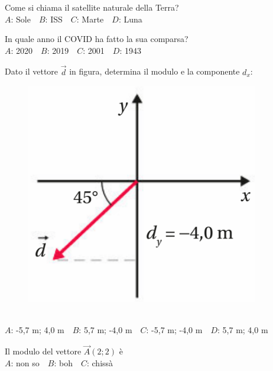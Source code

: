 \mcglobalheader
\def\mcserialnumber{10}
\mcpaperheader


\def\mcquestionnumber{1}


\mcquestionheader Come si chiama il satellite naturale della Terra?\\
{$A$}: Sole\ \ {$B$}: ISS\ \ {$C$}: Marte\ \ {$D$}: Luna\ \ 

\mcquestionfooter



\def\mcquestionnumber{2}


\mcquestionheader In quale anno il COVID ha fatto la sua comparsa?\\
{$A$}: 2020\ \ {$B$}: 2019\ \ {$C$}: 2001\ \ {$D$}: 1943\ \ 

\mcquestionfooter



\def\mcquestionnumber{3}


\mcquestionheader Dato il vettore $\vec{d}$ in figura, determina il modulo e la componente $d_x$: \begin{figure}[h!]   \begin{center}     \includegraphics[scale=0.35]{vettored.png}   \end{center} \end{figure}\\
{$A$}: -5,7 m; 4,0 m\ \ {$B$}: 5,7 m; -4,0 m\ \ {$C$}: -5,7 m; -4,0 m\ \ {$D$}: 5,7 m; 4,0 m\ \ 

\mcquestionfooter



\def\mcquestionnumber{4}


\mcquestionheader Il modulo del vettore $\vec{A}(2;2)$ è\\
{$A$}: non so\ \ {$B$}: boh\ \ {$C$}: chissà\ \ 

